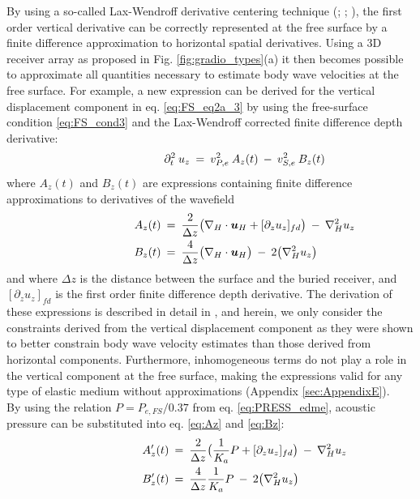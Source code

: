 \documentclass{article}
\begin{document}
	By using a so-called Lax-Wendroff derivative centering technique (\cite{lax1964difference}; \cite{blanch1997modified}; \cite{curtis2002volumetric}), the first order vertical derivative can be correctly represented at the free surface by a finite difference approximation to horizontal spatial derivatives. Using a 3D receiver array as proposed in Fig. \ref{fig:gradio_types}(a) it then becomes possible to approximate all quantities necessary to estimate body wave velocities at the free surface. For example, a new expression can be derived for the vertical displacement component in eq. \eqref{eq:FS_eq2a_3} by using the free-surface condition \eqref{eq:FS_cond3} and the Lax-Wendroff corrected finite difference depth derivative:
	\begin{align} \shoveright \shoveright \shoveright \shoveright \shoveright \shoveright 
		\partial_{t}^{2} \: u_{z} \: =  \: v_{P,e}^{2} \: A_{z}(t) \: - \: v_{S,e}^{2} \: B_{z}(t)  
		\label{eq:freeSurfT}   
	\end{align} 
	where $A_{z}(t)$ and $B_{z}(t)$ are expressions containing finite difference approximations to derivatives of the wavefield
	\begin{align} \shoveright \shoveright \shoveright \shoveright \shoveright \shoveright 
		A_{z}(t)  	\: &= \:   \frac{2}{\Delta z} \big(\nabla_{H} \cdot \bm{u}_{H} + [\partial_{z} u_{z}]_{fd} \big) \: - \: \nabla^{2}_{H} u_{z} \label{eq:Az} \\ 
		B_{z}(t) 	\: &= \:   \frac{4}{\Delta z} \big(\nabla_{H} \cdot \bm{u}_{H}\big) \: - \: 2\big(\nabla^{2}_{H}u_{z}\big)
		\label{eq:Bz}   
	\end{align}
	and where $\Delta z$ is the distance between the surface and the buried receiver, and $[\partial_{z} u_{z}]_{fd}$ is the first order finite difference depth derivative. The derivation of these expressions is described in detail in \textcite{curtis2002volumetric}, and herein, we only consider the constraints derived from the vertical displacement component as they were shown to better constrain body wave velocity estimates than those derived from horizontal components. Furthermore, inhomogeneous terms do not play a role in the vertical component at the free surface, making the expressions valid for any type of elastic medium without approximations (Appendix \ref{sec:AppendixE}). \\
	
	By using the relation $P=P_{e,FS}/0.37$ from eq. \eqref{eq:PRESS_edme}, acoustic pressure can be substituted into eq. \eqref{eq:Az} and \eqref{eq:Bz}:
	\begin{align} \shoveright \shoveright \shoveright \shoveright \shoveright \shoveright 
		A_{z}'(t)  	\: &= \:   \frac{2}{\Delta z} \big(\frac{1}{K_{a}}P + [\partial_{z} u_{z}]_{fd} \big) \: - \: \nabla^{2}_{H} u_{z} \label{eq:Az_new}  \\
		B_{z}'(t) 	\: &= \:   \frac{4}{\Delta z} \frac{1}{K_{a}}P \: - \: 2\big(\nabla^{2}_{H}u_{z}\big)
		\label{eq:Bz_new}   
	\end{align}
	
\end{document}
